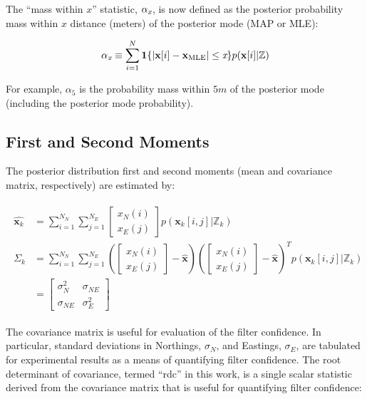 The ``mass within $x$'' statistic, $\alpha_\emph{x}$, is now defined as the posterior probability mass within $x$ distance (meters) of the posterior mode (MAP or MLE):

\begin{equation}
\alpha_\emph{x} \equiv \sum_{i=1}^{N} \mathbf{1}\{ | \mathbf{x}[i] - \mathbf{x}_{\text{MLE}} | \leq \emph{x}\} p(\mathbf{x}[i] | \mathbb{Z})
\label{eq:alpha}
\end{equation}

For example, $\alpha_5$ is the probability mass within $5m$ of the posterior mode (including the posterior mode probability).

\subsection{First and Second Moments}
\label{framework.Statistics.Moments}

The posterior distribution first and second moments (mean and covariance matrix, respectively) are estimated by:


\begin{align}
\begin{split}
\hat{\textbf{x}_k} &= \sum_{i=1}^{N_N}\sum_{j=1}^{N_E}\begin{bmatrix} x_{N}(i) \\ x_{E}(j) \end{bmatrix} p(\mathbf{x}_k[i,j] | \mathbb{Z}_k) \\
\Sigma_k &= \sum_{i=1}^{N_N}\sum_{j=1}^{N_E}\left(\begin{bmatrix} x_{N}(i) \\ x_{E}(j) \end{bmatrix} - \hat{\textbf{x}}\right)\left(\begin{bmatrix} x_{N}(i) \\ x_{E}(j) \end{bmatrix} - \hat{\textbf{x}}\right)^{T} p(\mathbf{x}_k[i,j] | \mathbb{Z}_k) \\
&= \begin{bmatrix} \sigma_N^{2} & \sigma_{NE} \\ \sigma_{NE} & \sigma_E^{2} \end{bmatrix}
\label{eq:meanCov}
\end{split}
\end{align}

The covariance matrix is useful for evaluation of the filter confidence.
In particular, standard deviations in Northings, $\sigma_N$, and Eastings, $\sigma_E$, are tabulated for experimental results as a means of quantifying filter confidence.
The root determinant of covariance, termed ``rdc'' in this work, is a single scalar statistic derived from the covariance matrix that is useful for quantifying filter confidence:

